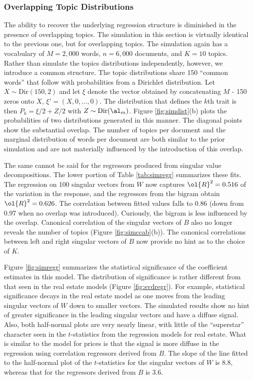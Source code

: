 \documentclass[10pt]{article}
\begin{document}
 
 \subsubsection{Overlapping Topic Distributions} %
 
 The ability to recover the underlying regression structure is diminished in the presence of overlapping topics.  The simulation in this section is virtually identical to the previous one, but for overlapping topics.  The simulation again has a vocabulary of $M=2,000$ words, $n=6,000$ documents, and $K=10$ topics.  Rather than simulate the topics distributions independently, however, we introduce a common structure.  The topic distributions share 150 ``common words'' that follow with probabilities from a Dirichlet distribution.  Let $X \sim \mbox{Dir}(150, 2)$ and let $\xi$ denote the vector obtained by concatenating $M$ - 150 zeros onto $X$, $\xi' = (X, 0 , \ldots, 0)$.  The distribution that defines the $k$th trait is then $P_k = \xi/2 + Z/2$ with $Z \sim \mbox{Dir}(\al_m)$.  Figure \ref{fig:simdist}(b) plots the probabilities of two distributions generated in this manner.  The diagonal points show the substantial overlap.  The number of topics per document and the marginal distribution of words per document are both similar to the prior simulation and are not materially influenced by the introduction of this overlap.
 
 
 The same cannot be said for the regressors produced from singular value decompositions.  The lower portion of Table \ref{tab:simregr} summarizes these fits.  The regression on 100 singular vectors from $W$ now captures $\ol{R}^2 = 0.516$ of the variation in the response, and the regressors from the bigram obtain $\ol{R}^2 = 0.626$.  The correlation between fitted values falls to 0.86 (down from 0.97 when no overlap was introduced).  Curiously, the bigram is less influenced by the overlap.  
 Canonical correlation of the singular vectors of $B$ also no longer reveals the number of topics (Figure \ref{fig:simccab}(b)).   The canonical correlations between left and right singular vectors of $B$ now provide no hint as to the choice of $K$.  
 
 
 Figure \ref{fig:simregr} summarizes the statistical significance of the coefficient estimates in this model.  The distribution of significance is rather different from that seen in the real estate models (Figure \ref{fig:svdregr}).  For example, statistical significance decays in the real estate model as one moves from the leading singular vectors of $W$ down to smaller vectors.  The simulated results show no hint of greater significance in the leading singular vectors and have a diffuse signal.
  Also, both half-normal plots are very nearly linear, with little of the ``superstar'' character seen in the $t$-statistics from the regression models for real estate.  What is similar to the model for prices is that the signal is more diffuse in the regression using correlation regressors derived from $B$.  The slope of the line fitted to the half-normal plot of the $t$-statistics for the singular vectors of $W$ is 8.8, whereas that for the regressors derived from $B$ is 3.6.  
 
\end{document}
